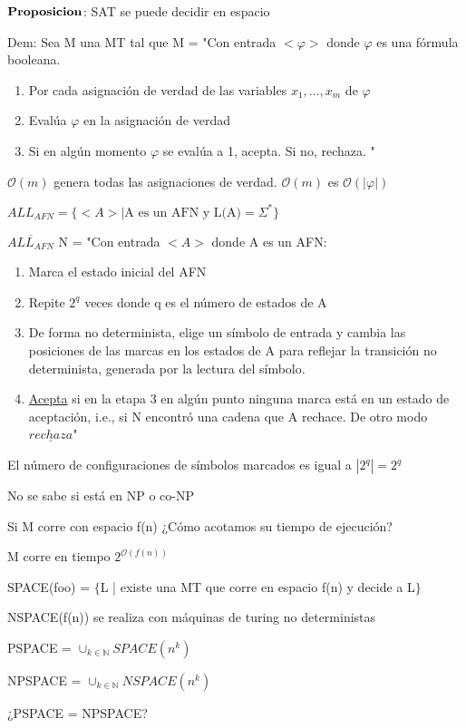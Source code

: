 \documentclass{homework}
\begin{document}
$\bf{Proposicion}$: SAT se puede decidir en espacio

Dem: Sea M una MT tal que 
M = "Con entrada $<\varphi>$ donde $\varphi$ es una fórmula booleana.
\begin{enumerate}
	\item Por cada asignación de verdad de las variables $x_1,...,x_m$ de $\varphi$
	\item Evalúa $\varphi$ en la asignación de verdad
	\item Si en algún momento $\varphi$ se evalúa a 1, acepta. Si no, rechaza. "
\end{enumerate}

$\mathcal{O}(m)$ genera todas las asignaciones de verdad.
$\mathcal{O}(m)$ es $\mathcal{O}(|\varphi|)$

$ALL_{AFN} = \{<A> | \text{A es un AFN y L(A)} = \Sigma^{*}\}$

$\overline{ALL_{AFN}}$
N = "Con entrada $<A>$ donde A es un AFN:
\begin{enumerate}
	\item Marca el estado inicial del AFN
	\item Repite $2^q$ veces donde q es el número de estados de A
	\item De forma no determinista, elige un símbolo de entrada y cambia las posiciones de las marcas en los estados de A para reflejar la transición no determinista, generada por la lectura del símbolo.
	\item \underline{Acepta} si en la etapa 3 en algún punto ninguna marca está en un estado de aceptación, i.e., si N encontró una cadena que A rechace. De otro modo $\underline{rechaza}$"
\end{enumerate}

El número de configuraciones de símbolos marcados es igual a $|2^q| = 2^q$

No se sabe si está en NP o co-NP

Si M corre con espacio f(n) ¿Cómo acotamos su tiempo de ejecución?

M corre en tiempo $2^{\mathcal{O}(f(n))}$

SPACE(foo) = $\{$L | existe una MT que corre en espacio f(n) y decide a L$\}$

NSPACE(f(n)) se realiza con máquinas de turing no deterministas

PSPACE = $\cup_{k \in \mathds{N}} SPACE(n^k)$

NPSPACE = $\cup_{k \in \mathds{N}} NSPACE(n^k)$

¿PSPACE = NPSPACE?
\end{document}
